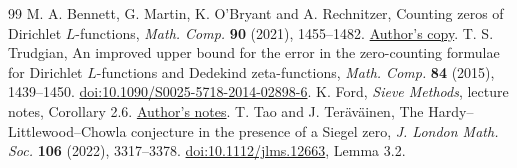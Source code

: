 \documentclass[11pt,letterpaper]{article}
\begin{document}
\begin{thebibliography}{99}
 M. A. Bennett, G. Martin, K. O'Bryant and A. Rechnitzer, Counting zeros of Dirichlet $L$-functions, \emph{Math. Comp.} \textbf{90} (2021), 1455--1482. \href{https://personal.math.ubc.ca/~bennett/BeMaObRe-MathComp-2021.pdf}{Author's copy}.
 T. S. Trudgian, An improved upper bound for the error in the zero-counting formulae for Dirichlet $L$-functions and Dedekind zeta-functions, \emph{Math. Comp.} \textbf{84} (2015), 1439--1450. \href{https://doi.org/10.1090/S0025-5718-2014-02898-6}{doi:10.1090/S0025-5718-2014-02898-6}.
 K. Ford, \emph{Sieve Methods}, lecture notes, Corollary 2.6. \href{https://ford126.web.illinois.edu/sieve2023.pdf}{Author's notes}.
 T. Tao and J. Ter\"av\"ainen, The Hardy--Littlewood--Chowla conjecture in the presence of a Siegel zero, \emph{J. London Math. Soc.} \textbf{106} (2022), 3317--3378. \href{https://doi.org/10.1112/jlms.12663}{doi:10.1112/jlms.12663}, Lemma 3.2.
\end{thebibliography}
\end{document}
